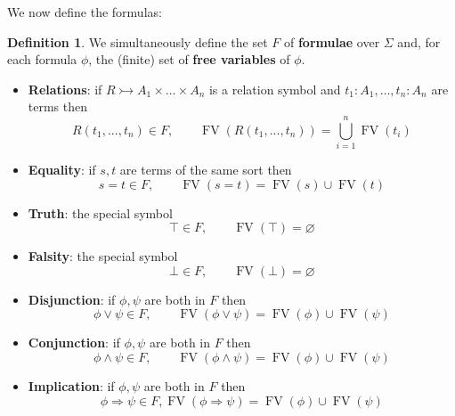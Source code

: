 \documentclass[12pt]{article}
\theoremstyle{plain}
\theoremstyle{definition}
\newtheorem{defn}[thm]{Definition} %
\begin{document}
	We now define the formulas:
	\begin{defn}
		We simultaneously define the set $F$ of \textbf{formulae} over $\Sigma$ and, for each formula $\phi$, the (finite) set of \textbf{free variables} of $\phi$.
		\begin{itemize}
			\item \textbf{Relations}: if $R \rightarrowtail A_1 \times \hdots \times A_n$ is a relation symbol and $t_1: A_1 , \hdots, t_n: A_n$ are terms then
			\begin{equation}
				R(t_1,...,t_n) \in F, \qquad \operatorname{FV}(R(t_1,...,t_n)) = \bigcup_{i = 1}^n \operatorname{FV}(t_i)
			\end{equation}
			\item \textbf{Equality}: if $s,t$ are terms of the same sort then
			\begin{equation}
				s = t \in F,\qquad \operatorname{FV}(s = t) = \operatorname{FV}(s) \cup \operatorname{FV}(t)
			\end{equation}
			\item \textbf{Truth}: the special symbol
			\begin{equation}
				\top \in F,\qquad \operatorname{FV}(\top) = \varnothing
			\end{equation}
			\item \textbf{Falsity}: the special symbol
			\begin{equation}
				\bot \in F,\qquad \operatorname{FV}(\bot) = \varnothing
			\end{equation}
			\item \textbf{Disjunction}: if $\phi,\psi$ are both in $F$ then
			\begin{equation}
				\phi \vee \psi \in F,\qquad \operatorname{FV}(\phi \vee \psi) = \operatorname{FV}(\phi) \cup \operatorname{FV}(\psi)
			\end{equation}
			\item \textbf{Conjunction}: if $\phi,\psi$ are both in $F$ then
			\begin{equation}
				\phi \wedge \psi \in F,\qquad \operatorname{FV}(\phi \wedge \psi) = \operatorname{FV}(\phi) \cup \operatorname{FV}(\psi)
			\end{equation}
			\item \textbf{Implication}: if $\phi, \psi$ are both in $F$ then
			\begin{equation}
				\phi \Rightarrow \psi \in F,\operatorname{FV}(\phi \Rightarrow \psi) = \operatorname{FV}(\phi) \cup \operatorname{FV}(\psi)
			\end{equation}

\end{itemize}
\end{defn}
\end{document}
